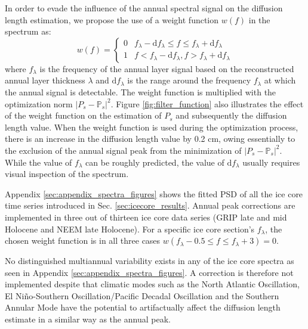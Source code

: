 \documentclass[11pt, draftcls, onecolumn]{IEEEtran} %
\numberwithin{equation}{section}
\numberwithin{table}{section}
\numberwithin{figure}{section}
\begin{document}
In order to evade the influence of the annual spectral signal on the diffusion length estimation, we propose the use of a weight 
function $w(f)$ in the spectrum as:
\begin{equation}\label{eq:weight_function}
w(f)= \left\{
\begin{array}{ll}
0 &  f_{\lambda} - \mathrm{d}f_{\lambda} \leq f \leq	 f_{\lambda} + \mathrm{d}f_{\lambda}\\ 
1                           &    f<f_{\lambda} - \mathrm{d}f_{\lambda}, f>f_{\lambda} + \mathrm{d}f_{\lambda}
\end{array} \right. {}
\end{equation}
where $f_\lambda$ is the frequency of the annual layer signal based on the reconstructed 
annual layer thickness $\lambda$ and $\mathrm{d}f_{\lambda}$ is the range around the frequency $f_{\lambda}$
at which the annual signal is detectable.
The weight function is multiplied with the optimization norm $\vert P_s - \mathbb{P}_s \vert^2$.
Figure \ref{fig:filter_function} also illustrates the effect of the weight function on the estimation of $P_s$ and subsequently 
the diffusion length value. When the weight function is used during the optimization process, there is an increase in the
diffusion length value by 0.2 cm, owing essentially to the exclusion of the annual signal peak from the minimization 
of $\vert P_s - \mathbb{P}_s \vert^2$.
While the value of $f_{\lambda}$ can be roughly predicted, the value of $\mathrm{d}f_{\lambda}$ usually requires visual 
inspection of the spectrum. 

Appendix \ref{sec:appendix_spectra_figures} shows the fitted PSD of all the ice core time series introduced in Sec. \ref{sec:icecore_results}.
Annual peak corrections are implemented in three out of thirteen ice core data series (GRIP late and mid Holocene and NEEM late Holocene).
For a specific ice core section's $f_{\lambda}$, the chosen weight function is in all three cases $w(f_{\lambda} - 0.5 \leq f \leq	 f_{\lambda} + 3) = 0$.

No distinguished multiannual variability exists in any of the ice core spectra as seen in Appendix \ref{sec:appendix_spectra_figures}.
A correction is therefore not implemented despite that climatic modes such as the North Atlantic Oscillation, 
El Ni\~{n}o-Southern Oscillation/Pacific Decadal Oscillation and the Southern Annular Mode 
have the potential to artifactually affect the diffusion length estimate in a similar way as the annual peak.
\end{document}
